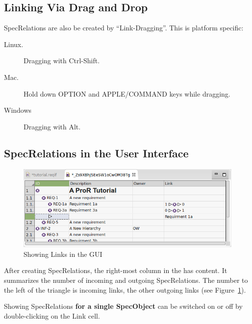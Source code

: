 \subsection{Linking Via Drag and Drop}

SpecRelations are also be created by ``Link-Dragging''.  This is platform specific:

\begin{description}

\item
  [Linux.] Dragging with Ctrl-Shift.
\item
  [Mac.] Hold down OPTION and APPLE/COMMAND keys while dragging.
\item
  [Windows] Dragging with Alt.
\end{description}

\subsection{SpecRelations in the User Interface}

\begin{figure}   
\centering      
\includegraphics[width=0.8\linewidth]{../rmf-images/links.png}      
\caption{Showing Links in the GUI}      
\label{fig:linksInGui}
\end{figure}

After creating SpecRelations, the right-most column  in the  has content.  It summarizes the number of incoming and outgoing SpecRelations.  The number to the left of the triangle is incoming links, the other outgoing links (see Figure~\ref{fig:linksInGui}).

Showing SpecRelations \textbf{for a single SpecObject} can be switched on or off by double-clicking on the Link cell.

